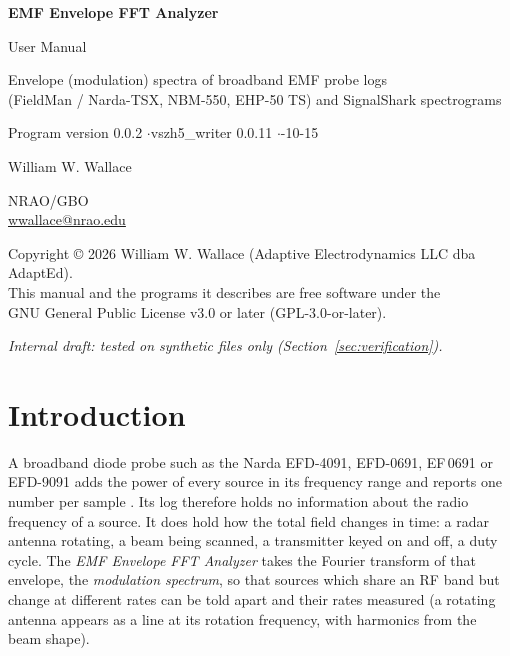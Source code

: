 \documentclass[10pt,letterpaper]{article}
\numberwithin{equation}{section}
\begin{document}
\begin{titlepage}
\centering
\vspace*{3cm}
{\Huge\bfseries EMF Envelope FFT Analyzer\par}
\vspace{0.6cm}
{\Large User Manual\par}
\vspace{1.2cm}
{\large Envelope (modulation) spectra of broadband EMF probe logs\\
(FieldMan / Narda-TSX, NBM-550, EHP-50 TS) and SignalShark spectrograms\par}
\vspace{1.5cm}
{\large Program version 0.0.2 \quad$\cdot$\quad vszh5\_writer 0.0.11 \quad$\cdot$-10-15\par}
\vspace{2cm}
{\large William W. Wallace\par}
NRAO/GBO\\
\href{mailto:wwallace@nrao.edu}{wwallace@nrao.edu}\par
\vfill
{\small Copyright \copyright{} 2026 William W. Wallace (Adaptive Electrodynamics LLC dba AdaptEd).\\
This manual and the programs it describes are free software under the\\
GNU General Public License v3.0 or later (GPL-3.0-or-later).\par}
\vspace{0.5cm}
{\small\itshape Internal draft: tested on synthetic files only (Section~\ref{sec:verification}).\par}
\end{titlepage}

\tableofcontents
\clearpage
{}
\listoftables
{}
\listoffigures
\clearpage

\section{Introduction}\label{sec:intro}

A broadband diode probe such as the Narda EFD-4091, EFD-0691, EF\,0691 or
EFD-9091 adds the power of every source in its frequency range and reports one
number per sample \cite{R1,R2,R3}. Its log therefore holds no information about
the radio frequency of a source. It does hold how the total field changes in
time: a radar antenna rotating, a beam being scanned, a transmitter keyed on and
off, a duty cycle. The \emph{EMF Envelope FFT Analyzer} takes the Fourier
transform of that envelope, the \emph{modulation spectrum}, so that sources which
share an RF band but change at different rates can be told apart and their rates
measured (a rotating antenna appears as a line at its rotation frequency, with
harmonics from the beam shape).
\end{document}
